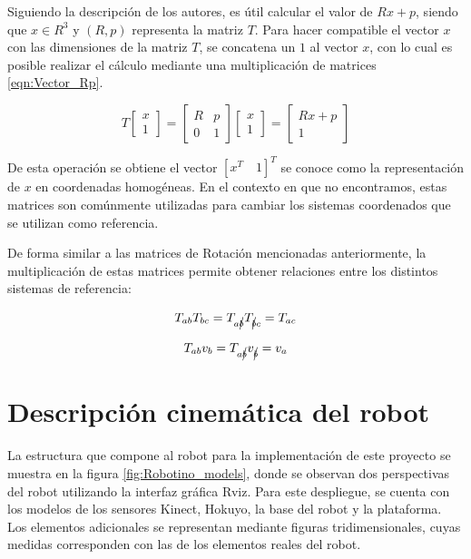 Siguiendo la descripción de los autores, es útil calcular el valor de $Rx+p$, siendo que $x \in R^{3}$ y $(R,p)$ representa la matriz $T$. Para hacer compatible el vector $x$ con las dimensiones de la matriz $T$, se concatena un $1$ al vector $x$, con lo cual es posible realizar el cálculo mediante una multiplicación de matrices \ref{eqn:Vector_Rp}.

\begin{equation}
    T \begin{bmatrix}
        x\\1
    \end{bmatrix} = 
    \begin{bmatrix}
	R & p\\
	0 & 1 
	\end{bmatrix}
    \begin{bmatrix}
	x\\
	1 
	\end{bmatrix}=
    \begin{bmatrix}
	Rx + p\\
    1 
	\end{bmatrix}
    \label{eqn:Vector_Rp}
\end{equation}

De esta operación se obtiene el vector $ \left[x^{T}\quad 1\right]^{T}$ se conoce como la representación de $x$ en coordenadas homogéneas. En el contexto en que no encontramos, estas matrices son comúnmente utilizadas para cambiar los sistemas coordenados que se utilizan como referencia. 

De forma similar a las matrices de Rotación mencionadas anteriormente, la multiplicación de estas matrices permite obtener relaciones entre los distintos sistemas de referencia:

\begin{equation}
    T_{ab}T_{bc} = T_{a\cancel{b}}T_{\cancel{b}c}=T_{ac}
    \label{eqn:Trans_Sist_Ref_Mat}
\end{equation}

\begin{equation}
    T_{ab}v_{b} = T_{a\cancel{b}}v_{\cancel{b}}=v_{a}
    \label{eqn:Trans_Sist_Ref_Vec}
\end{equation}

\section{Descripción cinemática del robot}

La estructura que compone al robot para la implementación de este proyecto se muestra en la figura \ref{fig:Robotino_models}, donde se observan dos perspectivas del robot utilizando la interfaz gráfica Rviz. Para este despliegue, se cuenta con los modelos de los sensores Kinect, Hokuyo, la base del robot y la plataforma. Los elementos adicionales se representan mediante figuras tridimensionales, cuyas medidas corresponden con las de los elementos reales del robot.

